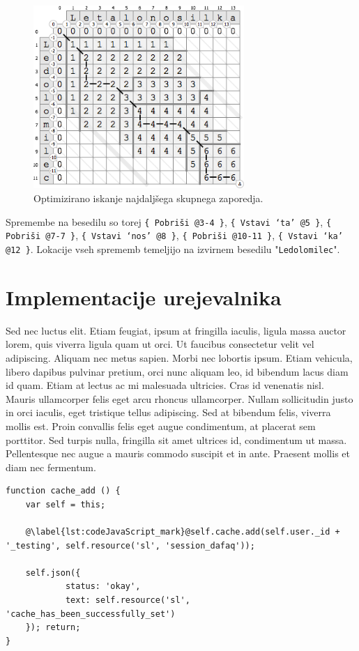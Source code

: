 \documentclass[a4paper, 12pt, twoside]{book}
\begin{document}
\begin{figure}[placement h]
\begin{center}
\includegraphics[width=8cm]{ses9.png}
\end{center}
\caption{Optimizirano iskanje najdaljšega skupnega zaporedja.}
\label{ses9}
\end{figure}

Spremembe na besedilu so torej {\tt \{ Pobriši @3-4 \}}, {\tt \{ Vstavi ‘ta’ @5 \}}, {\tt \{ Pobriši @7-7 \}}, {\tt \{ Vstavi ‘nos’ @8 \}}, {\tt \{ Pobriši @10-11 \}}, {\tt \{ Vstavi ‘ka’ @12 \}}. Lokacije vseh sprememb temeljijo na izvirnem besedilu "{\tt Ledolomilec}".

\chapter{Implementacije urejevalnika}

Sed nec luctus elit. Etiam feugiat, ipsum at fringilla iaculis, ligula massa auctor lorem, quis viverra ligula quam ut orci. Ut faucibus consectetur velit vel adipiscing. Aliquam nec metus sapien. Morbi nec lobortis ipsum. Etiam vehicula, libero dapibus pulvinar pretium, orci nunc aliquam leo, id bibendum lacus diam id quam. Etiam at lectus ac mi malesuada ultricies. Cras id venenatis nisl. Mauris ullamcorper felis eget arcu rhoncus ullamcorper. Nullam sollicitudin justo in orci iaculis, eget tristique tellus adipiscing. Sed at bibendum felis, viverra mollis est. Proin convallis felis eget augue condimentum, at placerat sem porttitor. Sed turpis nulla, fringilla sit amet ultrices id, condimentum ut massa. Pellentesque nec augue a mauris commodo suscipit et in ante. Praesent mollis et diam nec fermentum.

\begin{lstlisting}[caption={Interdum pretium}, label={lst:codeJavaScript}, title={Exampelus \ref{lst:codeJavaScript}: Interdum pretium}]
function cache_add () {
	var self = this;

	@\label{lst:codeJavaScript_mark}@self.cache.add(self.user._id + '_testing', self.resource('sl', 'session_dafaq'));

	self.json({
			status: 'okay',
			text: self.resource('sl', 'cache_has_been_successfully_set')
	}); return;
}
\end{lstlisting}
\end{document}
